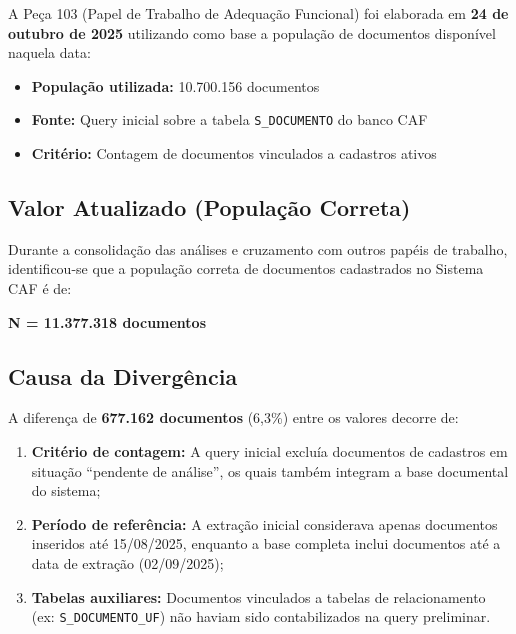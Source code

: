\documentclass[11pt,a4paper]{article}
\begin{document}
A Peça 103 (Papel de Trabalho de Adequação Funcional) foi elaborada em \textbf{24 de outubro de 2025} utilizando como base a população de documentos disponível naquela data:

\begin{itemize}
    \item \textbf{População utilizada:} 10.700.156 documentos
    \item \textbf{Fonte:} Query inicial sobre a tabela \texttt{S\_DOCUMENTO} do banco CAF
    \item \textbf{Critério:} Contagem de documentos vinculados a cadastros ativos
\end{itemize}

\subsection{Valor Atualizado (População Correta)}

Durante a consolidação das análises e cruzamento com outros papéis de trabalho, identificou-se que a população correta de documentos cadastrados no Sistema CAF é de:

\begin{destaque}
\begin{center}
\textbf{N = 11.377.318 documentos}
\end{center}
\end{destaque}

\subsection{Causa da Divergência}

A diferença de \textbf{677.162 documentos} (6,3\%) entre os valores decorre de:

\begin{enumerate}[label=\alph*)]
    \item \textbf{Critério de contagem:} A query inicial excluía documentos de cadastros em situação ``pendente de análise'', os quais também integram a base documental do sistema;

    \item \textbf{Período de referência:} A extração inicial considerava apenas documentos inseridos até 15/08/2025, enquanto a base completa inclui documentos até a data de extração (02/09/2025);

    \item \textbf{Tabelas auxiliares:} Documentos vinculados a tabelas de relacionamento (ex: \texttt{S\_DOCUMENTO\_UF}) não haviam sido contabilizados na query preliminar.
\end{enumerate}
\end{document}
